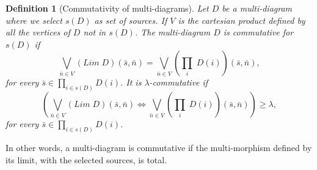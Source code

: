 \documentclass[oribibl]{llncs}
\newtheorem{defn}{Definition}
\begin{document}
\begin{defn}[Commutativity of multi-diagrams]
Let $D$ be a multi-diagram where we select $s(D)$ as set of sources. If $V$ is the cartesian product defined by all the vertices of $D$ not in $s(D)$. The multi-diagram $D$ is commutative for $s(D)$ if \[\bigvee_{\bar{n} \in V}(Lim\;D)(\bar{s},\bar{n})=\bigvee_{\bar{n}\in V}(\prod_i\;D(i))(\bar{s},\bar{n}),\] for every $\bar{s}\in \prod_{i\in s(D)}D(i)$. It is $\lambda$-commutative if  \[\left(\bigvee_{\bar{n}\in V}(Lim\;D)(\bar{s},\bar{n})\Leftrightarrow \bigvee_{\bar{n}\in V}(\prod_i\;D(i))(\bar{s},\bar{n})\right)\geq\lambda,\]for every $\bar{s}\in \prod_{i\in s(D)}D(i)$.
\end{defn}

In other words, a multi-diagram is commutative if the multi-morphism defined by its limit, with the selected sources, is total.
\end{document}
